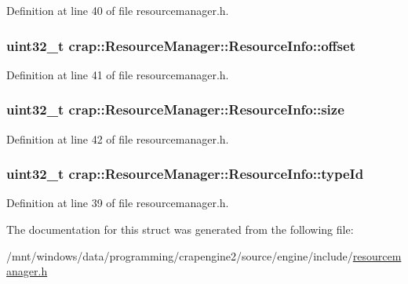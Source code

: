 Definition at line 40 of file resourcemanager.\+h.

\hypertarget{structcrap_1_1_resource_manager_1_1_resource_info_ad2c655eaf108741d772e0905dc0daa6b}{}
\subsubsection[{offset}]{\setlength{\rightskip}{0pt plus 5cm}uint32\+\_\+t crap\+::\+Resource\+Manager\+::\+Resource\+Info\+::offset}\label{structcrap_1_1_resource_manager_1_1_resource_info_ad2c655eaf108741d772e0905dc0daa6b}


Definition at line 41 of file resourcemanager.\+h.

\hypertarget{structcrap_1_1_resource_manager_1_1_resource_info_a6f6d3295854ec9c59bb39ad39764c7d8}{}
\subsubsection[{size}]{\setlength{\rightskip}{0pt plus 5cm}uint32\+\_\+t crap\+::\+Resource\+Manager\+::\+Resource\+Info\+::size}\label{structcrap_1_1_resource_manager_1_1_resource_info_a6f6d3295854ec9c59bb39ad39764c7d8}


Definition at line 42 of file resourcemanager.\+h.

\hypertarget{structcrap_1_1_resource_manager_1_1_resource_info_a25ed728173b3bf40cd2d4d38a66a0abe}{}
\subsubsection[{type\+Id}]{\setlength{\rightskip}{0pt plus 5cm}uint32\+\_\+t crap\+::\+Resource\+Manager\+::\+Resource\+Info\+::type\+Id}\label{structcrap_1_1_resource_manager_1_1_resource_info_a25ed728173b3bf40cd2d4d38a66a0abe}


Definition at line 39 of file resourcemanager.\+h.



The documentation for this struct was generated from the following file\+:\begin{DoxyCompactItemize}
\item 
/mnt/windows/data/programming/crapengine2/source/engine/include/\hyperlink{resourcemanager_8h}{resourcemanager.\+h}\end{DoxyCompactItemize}
